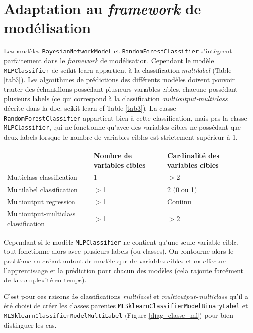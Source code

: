 \section{Adaptation au \textit{framework} de modélisation}

Les modèles \texttt{BayesianNetworkModel} et \texttt{RandomForestClassifier} s’intègrent parfaitement dans le \textit{framework} de modélisation. Cependant le modèle \texttt{MLPClassifier} de scikit-learn appartient à la classification \textit{multilabel} (Table \ref{tab3}). Les algorithmes de prédictions des différents modèles doivent pouvoir traiter des échantillons possédant plusieurs variables cibles, chacune possédant plusieurs labels (ce qui correspond à la classification \textit{multioutput-multiclass} décrite dans la doc. scikit-learn cf Table \ref{tab3}). La classe \texttt{RandomForestClassifier} appartient bien à cette classification, mais pas la classe \texttt{MLPClassifier}, qui ne fonctionne qu’avec des variables cibles ne possédant que deux labels lorsque le nombre de variables cibles est strictement supérieur à 1.

\begin{center}
\begin{tabular}{lp{2.4cm}p{2.5cm}}
\rowcolor[RGB]{200, 200, 200} & Nombre de variables cibles & Cardinalité des variables cibles \\
\hline
Multiclass classification & 1 & $>$2 \\
Multilabel classification & $>$1 & 2 (0 ou 1) \\
Multioutput regression & $>$1 & Continu \\
Multioutput-multiclass classification & $>$1 & $>$2

\end{tabular}
\label{tab3}
\end{center}

Cependant si le modèle \texttt{MLPClassifier} ne contient qu’une seule variable cible, tout fonctionne alors avec plusieurs labels (ou classes). On contourne alors le problème en créant autant de modèle que de variables cibles et on effectue l’apprentissage et la prédiction pour chacun des modèles (cela rajoute forcément de la complexité en temps).

C’est pour ces raisons de classifications \textit{multilabel} et \textit{multioutput-multiclass} qu’il a été choisi de créer les classes parentes \texttt{MLSklearnClassifierModelBinaryLabel} et \texttt{MLSklearnClassifierModelMultiLabel} (Figure \ref{diag_classe_ml}) pour bien distinguer les cas.

